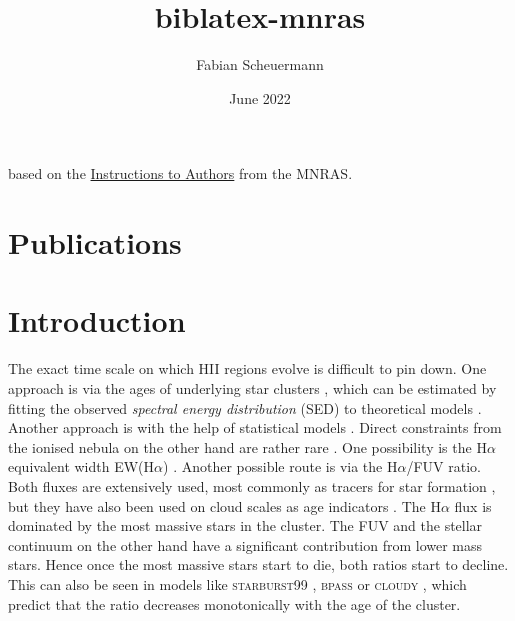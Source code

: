 \documentclass{scrartcl}
\title{biblatex-mnras}
\author{Fabian Scheuermann}
\date{June 2022}
\makeatletter
\newcommand\Setmaxbibnames[1]{\renewcommand\blx@maxbibnames{#1}}
\makeatother
\begin{document}
\maketitle

based on the \href{https://academic.oup.com/mnras/pages/general_instructions?login=false#6.3\%20References\%20and\%20citations}{Instructions to Authors} from the MNRAS.

\section*{Publications}
\begin{refsection}
\Setmaxbibnames{1}
\nocite{*}

\printbibliography[heading=none]
\end{refsection}


\newpage
\section{Introduction}
The exact time scale on which HII regions evolve is difficult to pin down. One approach is via the ages of underlying star clusters \parencite[e.g.][]{Whitmore+2011,Hannon+2019,Hannon+2022,Stevance+2020}
, which can be estimated by fitting the observed \emph{spectral energy distribution} (SED) to theoretical models \parencite{Turner+2021}. Another approach is with the help of statistical models \parencite[e.g.][]{Chevance+2020a,Kim+2021}. 
Direct constraints from the ionised nebula on the other hand are rather rare \parencite{Dottori+1981}. One possibility is the H$\alpha$ equivalent width EW(H$\alpha$) \parencite{Copetti+1986,Fernandes+2003,Levesque+2013}. Another possible route is via the H$\alpha$/FUV ratio. Both fluxes are extensively used, most commonly as tracers for star formation \parencite{Hermanowicz+2013,Meurer+2009}, but they have also been used on cloud scales as age indicators \parencite[e.g.][]{SanchezGil+2011,Faesi+2014}. The H$\alpha$ flux is dominated by the most massive stars in the cluster. The FUV and the stellar continuum on the other hand have a significant contribution from lower mass stars. Hence once the most massive stars start to die, both ratios start to decline. This can also be seen in models like \textsc{starburst99} \parencite{Leitherer+2014}, \textsc{bpass} \parencite{Eldridge+2009} or \textsc{cloudy} \parencite{Ferland+2017}, which predict that the ratio decreases monotonically with the age of the cluster.

\printbibliography[title={References}]
\end{document}
